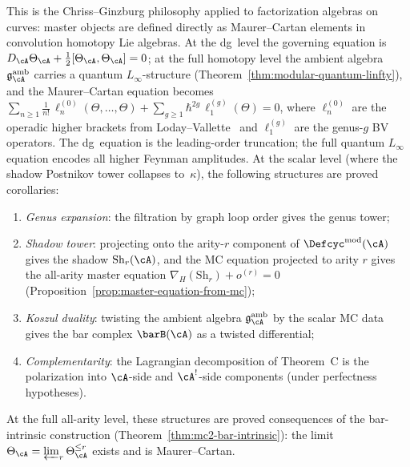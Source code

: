 \begin{remark}
\label{rem:chriss-ginzburg-philosophy}
This is the Chriss--Ginzburg philosophy applied to factorization
algebras on curves: master objects are defined directly as
Maurer--Cartan elements in convolution homotopy Lie algebras.  At
the dg~level the governing equation is
$D_{\cA}\Theta_{\cA} + \tfrac12[\Theta_{\cA},\Theta_{\cA}] = 0$;
at the full homotopy level the ambient algebra
$\mathfrak{g}_\cA^{\mathrm{amb}}$ carries a quantum
$L_\infty$-structure
(Theorem~\ref{thm:modular-quantum-linfty}), and the
Maurer--Cartan equation becomes
$\sum_{n \geq 1}\tfrac{1}{n!}\,\ell_n^{(0)}(\Theta,\dots,\Theta)
+ \sum_{g \geq 1}\hbar^{2g}\,\ell_1^{(g)}(\Theta) = 0$,
where $\ell_n^{(0)}$ are the operadic higher brackets from
Loday--Vallette~\cite[Thm~10.3.8]{LV12} and $\ell_1^{(g)}$ are
the genus-$g$ BV operators.  The dg~equation is the leading-order
truncation; the full quantum $L_\infty$ equation encodes all
higher Feynman amplitudes.
At the scalar level (where the shadow Postnikov tower
collapses to~$\kappa$), the following structures are
proved corollaries:
\begin{enumerate}[label=\textup{(\roman*)}]
\item \emph{Genus expansion}: the filtration by graph loop order gives the genus tower;
\item \emph{Shadow tower}: projecting onto the arity-$r$ component of $\Defcyc^{\mathrm{mod}}(\cA)$ gives the shadow $\mathrm{Sh}_r(\cA)$, and the MC equation projected to arity $r$ gives the all-arity master equation $\nabla_H(\mathrm{Sh}_r) + o^{(r)} = 0$ (Proposition~\ref{prop:master-equation-from-mc});
\item \emph{Koszul duality}: twisting the ambient algebra $\mathfrak{g}^{\mathrm{amb}}_\cA$ by the scalar MC data gives the bar complex $\barB(\cA)$ as a twisted differential;
\item \emph{Complementarity}: the Lagrangian decomposition of Theorem~C is the polarization into $\cA$-side and $\cA^!$-side components (under perfectness hypotheses).
\end{enumerate}
At the full all-arity level, these structures are
proved consequences of the bar-intrinsic construction
(Theorem~\ref{thm:mc2-bar-intrinsic}): the limit
$\Theta_\cA = \varprojlim_r \Theta_\cA^{\leq r}$ exists
and is Maurer--Cartan.
\end{remark}

